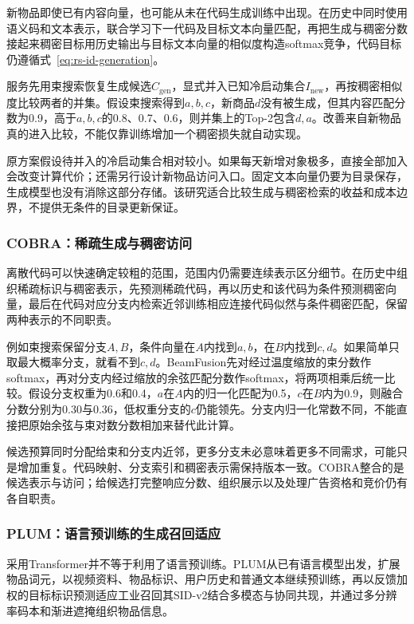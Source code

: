 新物品即使已有内容向量，也可能从未在代码生成训练中出现。在历史中同时使用语义码和文本表示，联合学习下一代码及目标文本向量匹配，再把生成与稠密分数接起来稠密目标用历史输出与目标文本向量的相似度构造softmax竞争，代码目标仍遵循式~\eqref{eq:rs-id-generation}。

服务先用束搜索恢复生成候选$C_{\mathrm{gen}}$，显式并入已知冷启动集合$I_{\mathrm{new}}$，再按稠密相似度比较两者的并集。假设束搜索得到$a,b,c$，新商品$d$没有被生成，但其内容匹配分数为0.9，高于$a,b,c$的0.8、0.7、0.6，则并集上的Top-2包含$d,a$。改善来自新物品真的进入比较，不能仅靠训练增加一个稠密损失就自动实现。

原方案假设待并入的冷启动集合相对较小。如果每天新增对象极多，直接全部加入会改变计算代价；还需另行设计新物品访问入口。固定文本向量仍要为目录保存，生成模型也没有消除这部分存储。该研究适合比较生成与稠密检索的收益和成本边界，不提供无条件的目录更新保证。

\subsubsection{COBRA：稀疏生成与稠密访问}
\label{sec:rs-cobra}

离散代码可以快速确定较粗的范围，范围内仍需要连续表示区分细节。在历史中组织稀疏标识与稠密表示，先预测稀疏代码，再以历史和该代码为条件预测稠密向量，最后在代码对应分支内检索近邻训练相应连接代码似然与条件稠密匹配，保留两种表示的不同职责。

例如束搜索保留分支$A,B$，条件向量在$A$内找到$a,b$，在$B$内找到$c,d$。如果简单只取最大概率分支，就看不到$c,d$。BeamFusion先对经过温度缩放的束分数作softmax，再对分支内经过缩放的余弦匹配分数作softmax，将两项相乘后统一比较。假设分支权重为0.6和0.4，$a$在$A$内的归一化匹配为0.5，$c$在$B$内为0.9，则融合分数分别为0.30与0.36，低权重分支的$c$仍能领先。分支内归一化常数不同，不能直接把原始余弦与束对数分数相加来替代此计算。

候选预算同时分配给束和分支内近邻，更多分支未必意味着更多不同需求，可能只是增加重复。代码映射、分支索引和稠密表示需保持版本一致。COBRA整合的是候选表示与访问；给候选打完整响应分数、组织展示以及处理广告资格和竞价仍有各自职责。

\Needspace{120mm}
\subsubsection{PLUM：语言预训练的生成召回适应}
\label{sec:rs-plum}

采用Transformer并不等于利用了语言预训练。PLUM从已有语言模型出发，扩展物品词元，以视频资料、物品标识、用户历史和普通文本继续预训练，再以反馈加权的目标标识预测适应工业召回其SID-v2结合多模态与协同共现，并通过多分辨率码本和渐进遮掩组织物品信息。

